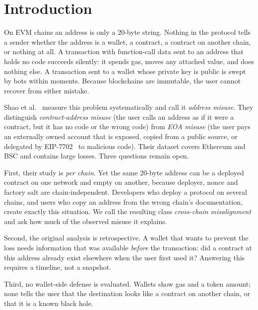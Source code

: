 \documentclass[runningheads]{llncs}
\begin{document}
\section{Introduction}
\label{sec:intro}
On EVM chains an address is only a 20-byte string. Nothing in the protocol tells
a sender whether the address is a wallet, a contract, a contract on another
chain, or nothing at all. A transaction with function-call data sent to an
address that holds no code succeeds silently: it spends gas, moves any attached
value, and does nothing else. A transaction sent to a wallet whose private key is
public is swept by bots within moments. Because blockchains are immutable, the
user cannot recover from either mistake.

Shao et al.~\cite{shao2026lost} measure this problem systematically and call it
\emph{address misuse}. They distinguish \emph{contract-address misuse} (the user
calls an address as if it were a contract, but it has no code or the wrong code)
from \emph{EOA misuse} (the user pays an externally owned account that is
exposed, copied from a public source, or delegated by EIP-7702~\cite{eip7702} to
malicious code). Their dataset covers Ethereum and BSC and contains large
losses. Three questions remain open.

First, their study is \emph{per chain}. Yet the same 20-byte address can be a
deployed contract on one network and empty on another, because deployer, nonce
and factory salt are chain-independent. Developers who deploy a protocol on
several chains, and users who copy an address from the wrong chain's
documentation, create exactly this situation. We call the resulting class
\emph{cross-chain misalignment} and ask how much of the observed misuse it
explains.

Second, the original analysis is retrospective. A wallet that wants to prevent
the loss needs information that was available \emph{before} the transaction:
did a contract at this address already exist elsewhere when the user first
used it? Answering this requires a timeline, not a snapshot.

Third, no wallet-side defense is evaluated. Wallets show gas and a token amount;
none tells the user that the destination looks like a contract on another chain,
or that it is a known black hole.
\end{document}
